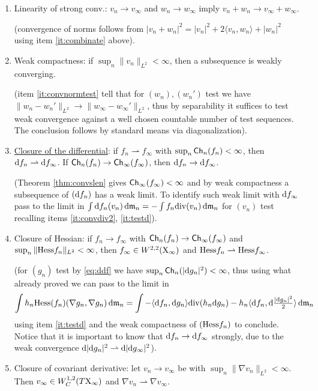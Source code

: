 \documentclass[11pt]{article}
\numberwithin{equation}{section}
\newcommand{\X}{{\rm X}}
\newcommand{\mm}{{\mathfrak m}}
\newcommand{\ch}{{\sf Ch}}
\renewcommand{\d}{{\rm d}}
\renewcommand{\div}{{\rm div}}
\newcommand{\weakto}{\rightharpoonup}
\newcommand\la{\langle}
\newcommand\ra{\rangle}
\begin{document}
\begin{enumerate}[label=(\roman*)]
\item\label{it:strlin} {\sc Linearity of strong conv.}: $v_n\to v_\infty$ and $w_n\to w_\infty$ imply $  v_n+  w_n\to  v_\infty+  w_\infty$.   

{\footnotesize {\vspace{-5pt}}(convergence of norms follows from $|  v_n+  w_n|^2=|v_n|^2+2\la v_n,w_n\ra+|w_n|^2$  using item \ref{it:combinate} above).}



\item\label{it:wcomp} {\sc Weak compactness}: if $\sup_n\|v_n\|_{L^2}<\infty$, then a subsequence is weakly converging. 

{\footnotesize {\vspace{-5pt}}(item \ref{it:convnormtest}  tell that for $(w_n),(w_n')$ test we have $\|w_n-w_n'\|_{L^2}\to \|w_\infty-w_\infty'\|_{L^2}$, thus by separability  it suffices to test weak convergence against a well chosen countable number of test sequences. The conclusion follows by standard means via diagonalization).}
\item\label{it:cldiff} {\sc\underline{Closure of the differential}}: if $f_n\weakto f_\infty $  with $\sup_n\ch_n(f_n)<\infty$, then $\d f_n\weakto \d f_\infty$. If  $\ch_n(f_n)\to \ch_\infty(f_\infty)$, then  $\d f_n\to \d f_\infty$. 

{\footnotesize {\vspace{-5pt}} (Theorem \ref{thm:convslen} gives $\ch_\infty(f_\infty)<\infty$ and by weak compactness a subsequence of $(\d f_n)$ has a weak limit. To identify such weak limit with $\d f_\infty$ pass to  the limit in $\int \d f_n(v_n)\,\d\mm_n=-\int f_n\div(v_n)\,\d\mm_n$ for $(v_n)$ test recalling items \ref{it:convdiv2}, \ref{it:testd}).}
\item\label{it:convHess} {\sc Closure of Hessian}: if $f_n\to f_\infty$ with $\ch_n(f_n)\to \ch_\infty(f_\infty)$ and $\sup_n\|{\rm Hess}f_n\|_{L^2}<\infty$, then $f_\infty\in W^{2,2}(\X_\infty)$ and ${\rm Hess}f_n\weakto {\rm Hess}f_\infty$. 

{\footnotesize {\vspace{-5pt}}(for $(g_n)$ test by \eqref{eq:ddf} we have $\sup_n\ch_n(|\d g_n|^2)<\infty$, thus using what already proved   we can pass to the limit in 
\[
\int h_n{\rm Hess}(f_n)(\nabla g_n,\nabla g_n)\,\d\mm_n=\int- \la\d f_n,\d g_n\ra\div(h_n\d g_n)-h_n\la \d f_n,\d\tfrac{|\d g_n|^2}2\ra\,\d\mm_n
\]
using item \ref{it:testd} and the weak compactness  of $({\rm Hess}f_n)$ to conclude. Notice that it is important to know that $\d f_n\to\d f_\infty$ strongly, due to the  weak convergence  $\d|\d g_n|^2\weakto \d|\d g_\infty|^2$).}
\item\label{it:closcovder} {\sc Closure of covariant derivative}: let  $v_n\to v_\infty$ be  with $\sup_n\|\nabla v_n\|_{L^2}<\infty$. Then $v_\infty\in W^{1,2}_C(T\X_\infty)$ and $\nabla v_n\weakto \nabla v_\infty$. 


\end{enumerate}
\end{document}
